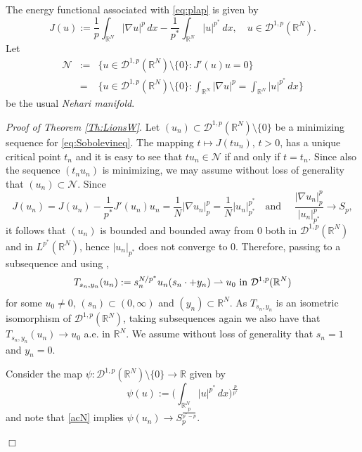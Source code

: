 \documentclass[12pt,leqno,twoside]{amsart}
\newenvironment{altproof}[1]
{\noindent%
{\em Proof of {#1}}.}
{\nopagebreak\mbox{}\hfill $\Box$\par\addvspace{0.5cm}}
\def\R{\mathbb{R}}
\def\rn{\mathbb{R}^N}
\newcommand{\cD}{{\mathcal D}}
\newcommand{\cN}{{\mathcal N}}
\def\rn{\mathbb{R}^N}
\newcommand{\weakto}{\rightharpoonup}
\numberwithin{equation}{section}
\begin{document}
The energy functional associated with \eqref{eq:plap} is given by
\begin{equation}\label{eq:actionN}
J(u):=\frac1p\int_{\R^N} |\nabla u|^p\,dx- \frac1{p^*}\int_{\R^N} |u|^{p^*}\, dx,\quad u\in \cD^{1,p}(\R^N).
\end{equation}
Let
\begin{eqnarray}\label{def:NehN}
\cN &:= & \{u\in \cD^{1,p}(\R^N)\setminus\{0\}: J'(u)u=0\} \\
& = & \Big\{u\in \cD^{1,p}(\R^N)\setminus\{0\}: \int_{\R^N}|\nabla  u|^p=\int_{\R^N}|u|^{p^*}\, dx\Big\} \nonumber
\end{eqnarray}
be the usual  {\em Nehari manifold}.

\medskip


\begin{altproof}{Theorem \ref{Th:LionsW}}
Let  $(u_n)\subset \cD^{1,p}(\R^N)\setminus\{0\}$ be a minimizing sequence for \eqref{eq:Sobolevineq}. The mapping $t\mapsto J(tu_n)$, $t>0$, has a unique critical point $t_n$ and it is easy to see that  $tu_n\in\cN$ if and only if $t=t_n$. Since also the sequence $(t_nu_n)$ is minimizing, we may assume without loss of generality that $(u_n)\subset \cN$.  Since
	\begin{equation} \label{acN}
	J(u_n) = J(u_n) -\frac1{p^*}J'(u_n)u_n = \frac1N|\nabla u_n|^p_p= \frac1N|u_n|^{p^*}_{p^*} \quad \text{and } \quad  \frac{|\nabla u_n|_p^p}{|u_n|_{p^*}^p} \to S_p,
	\end{equation}
	 it follows that $(u_n)$ is bounded and bounded away from 0 both in $\cD^{1,p}(\R^N)$ and in $L^{p^*}(\rn)$, hence $|u_n|_{p^*}$ does not converge to $0$.
	Therefore, passing to a subsequence and using \cite{Solimini}, 
	$$T_{s_n,y_n}(u_n):=s_n^{N/p^*}u_n(s_n\cdot+y_n)\weakto u_0\hbox{ in } \cD^{1,p}(\R^N)$$ 
	for some $u_0\neq 0$, $(s_n)\subset (0,\infty)$ and $(y_n)\subset \R^N$. As $T_{s_n,y_n}$ is an isometric isomorphism of $\cD^{1,p}(\R^N)$, taking subsequences again we also have that $T_{s_n,y_n}(u_n)\to u_0$ a.e. in $\R^N$. We assume without loss of generality that $s_n=1$ and $y_n=0$. 
	
	Consider the map $\psi:\cD^{1,p}(\R^N)\setminus\{0\}\to\R$ given by 
	$$\psi(u):=\Big(\int_{\R^N}|u|^{p^*}\,dx\Big)^{\frac{p}{p^*}}$$
	and note that \eqref{acN} implies
	$\psi(u_n)\to S_p^{\frac{p}{p^*-p}}$.
	

\end{altproof}
\end{document}
